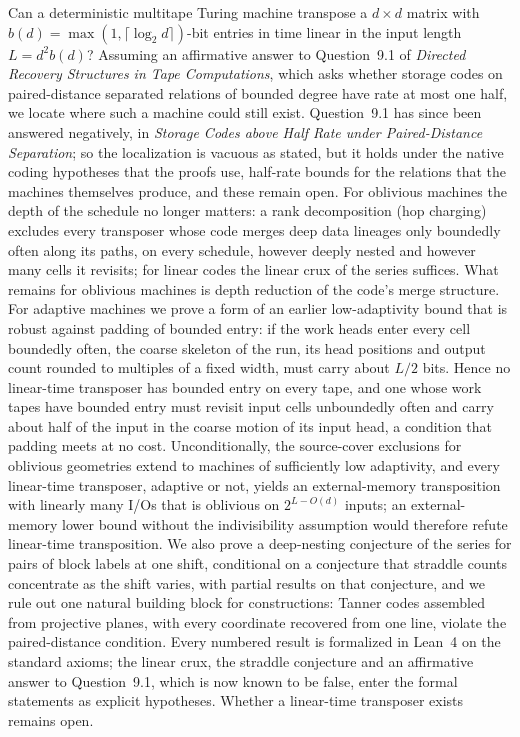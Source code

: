 Can a deterministic multitape Turing machine transpose a $d\times d$ matrix with $b(d)=\max(1,\lceil\log_2d\rceil)$-bit
entries in time linear in the input length $L=d^2b(d)$? Assuming an affirmative answer to Question~9.1 of \emph{Directed
Recovery Structures in Tape Computations}, which asks whether storage codes on paired-distance separated relations of
bounded degree have rate at most one half, we locate where such a machine could still exist. Question~9.1 has since been
answered negatively, in \emph{Storage Codes above Half Rate under Paired-Distance Separation}; so the localization is
vacuous as stated, but it holds under the native coding hypotheses that the proofs use, half-rate bounds for the relations
that the machines themselves produce, and these remain open. For oblivious machines the
depth of the schedule no longer matters: a rank decomposition (hop charging) excludes every transposer whose code merges
deep data lineages only boundedly often along its paths, on every schedule, however deeply nested and however many cells
it revisits; for linear codes the linear crux of the series suffices. What remains for oblivious machines is depth
reduction of the code's merge structure. For adaptive machines we prove a form of an earlier low-adaptivity bound that
is robust against padding of bounded entry: if the work heads enter every cell boundedly often, the coarse skeleton of
the run, its head positions and output count rounded to multiples of a fixed width, must carry about $L/2$ bits. Hence
no linear-time transposer has bounded entry on every tape, and one whose work tapes have bounded entry must revisit
input cells unboundedly often and carry about half of the input in the coarse motion of its input head, a condition
that padding meets at no cost. Unconditionally, the source-cover exclusions for oblivious geometries extend to machines
of sufficiently low adaptivity, and every linear-time transposer, adaptive or not, yields an external-memory
transposition with linearly many I/Os that is oblivious on $2^{L-O(d)}$ inputs; an external-memory lower bound without
the indivisibility assumption would therefore refute linear-time transposition. We also prove a deep-nesting conjecture
of the series for pairs of block labels at one shift, conditional on a conjecture that straddle counts concentrate as
the shift varies, with partial results on that conjecture, and we rule out one natural building block for
constructions: Tanner codes assembled from projective planes, with every coordinate recovered from one line, violate the
paired-distance condition. Every numbered result is formalized in Lean~4 on the standard axioms; the linear crux, the
straddle conjecture and an affirmative answer to Question~9.1, which is now known to be false, enter the formal
statements as explicit hypotheses. Whether a linear-time transposer exists remains open.
